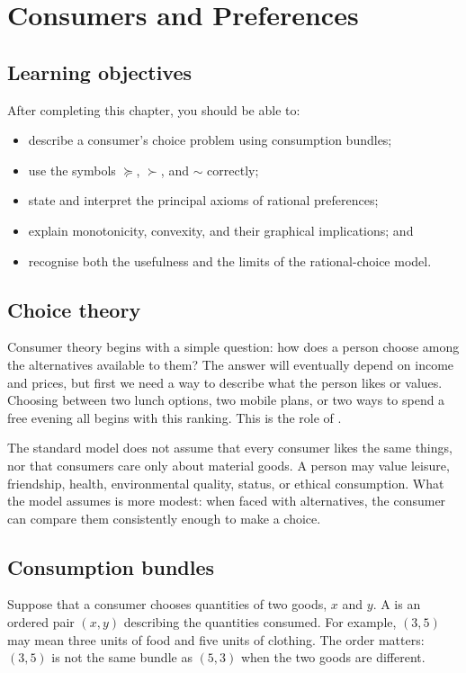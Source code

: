 \chapter{Consumers and Preferences}
\label{chap:preferences}

\section{Learning objectives}

After completing this chapter, you should be able to:
\begin{itemize}
  \item describe a consumer's choice problem using consumption bundles;
  \item use the symbols $\succeq$, $\succ$, and $\sim$ correctly;
  \item state and interpret the principal axioms of rational preferences;
  \item explain monotonicity, convexity, and their graphical implications; and
  \item recognise both the usefulness and the limits of the rational-choice model.
\end{itemize}

\section{Choice theory}

Consumer theory begins with a simple question: how does a person choose among
the alternatives available to them? The answer will eventually depend on
income and prices, but first we need a way to describe what the person likes
or values. Choosing between two lunch options, two mobile plans, or two ways
to spend a free evening all begins with this ranking. This is the role of
.

The standard model does not assume that every consumer likes the same things,
nor that consumers care only about material goods. A person may value leisure,
friendship, health, environmental quality, status, or ethical consumption.
What the model assumes is more modest: when faced with alternatives, the
consumer can compare them consistently enough to make a choice.

\section{Consumption bundles}

Suppose that a consumer chooses quantities of two goods, $x$ and $y$. A
 is an ordered pair $(x,y)$ describing the
quantities consumed. For example, $(3,5)$ may mean three units of food and
five units of clothing. The order matters: $(3,5)$ is not the same bundle as
$(5,3)$ when the two goods are different.

